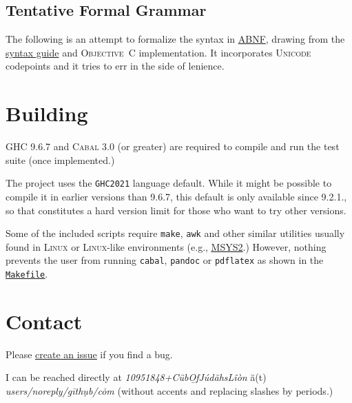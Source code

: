 \documentclass[11pt]{article}
\newcommand{\link}[2]{\underline{\color{darkblue}\href{#1}{#2}}}
\begin{document}
  \subsection*{Tentative Formal Grammar}
  The following is an attempt to formalize the syntax in
  \href{https://datatracker.ietf.org/doc/html/rfc5234}{\textsc{ABNF}},
  drawing from the \href{https://fountain.io/syntax/}{syntax guide} and
  \textsc{Objective~C} implementation.  It incorporates \textsc{Unicode}
  codepoints and it tries to err in the side of lenience.
  
  

\section*{Building}
\textsc{GHC} 9.6.7 and \textsc{Cabal} 3.0 (or greater) are required to
compile and run the test suite (once implemented.)

The project uses the \texttt{GHC2021} language default. While it might
be possible to compile it in earlier versions than 9.6.7, this default
is only available since 9.2.1., so that constitutes a hard version limit
for those who want to try other versions.

Some of the included scripts require \texttt{make}, \texttt{awk} and
other similar utilities usually found in \textsc{Linux} or
\textsc{Linux}-like environments (e.g.,
\link{https://www.msys2.org/}{\textsc{MSYS2}}.) However, nothing
prevents the user from running \texttt{cabal}, \texttt{pandoc} or
\texttt{pdflatex} as shown in the
\link{run:./Makefile}{\texttt{Makefile}}.

\section*{Contact} Please
\link{https://github.com/CubOfJudahsLion/fountain-parser/issues}{create an issue}
if you find a bug.

I can be reached directly at
\emph{10951848+C\"{u}b\b{O}fJ\'{u}d\~{a}hsL\^{i}\`{o}n} \u{a}(t)
\emph{users/noreply/g\={i}th\d{u}b/c\.{o}m} (without accents and
replacing slashes by periods.)
\end{document}

